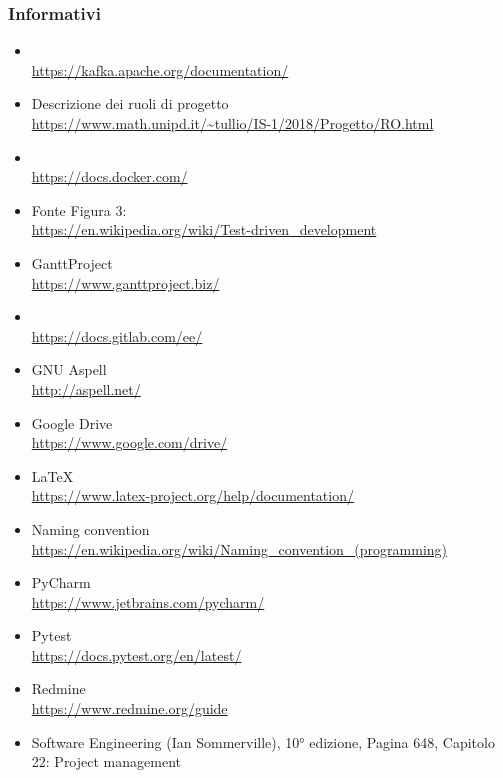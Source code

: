     \subsubsection{Informativi}	\label{rifinfo}
    \begin{itemize}
		\item {} \\\url{https://kafka.apache.org/documentation/}
        \item Descrizione dei ruoli di progetto \\\url{https://www.math.unipd.it/~tullio/IS-1/2018/Progetto/RO.html}
        \item {} \\\url{https://docs.docker.com/}
        \item Fonte Figura 3: \\\url{https://en.wikipedia.org/wiki/Test-driven_development}
        \item GanttProject \\\url{https://www.ganttproject.biz/}
		\item {} \\\url{https://docs.gitlab.com/ee/}
		\item GNU Aspell \\\url{http://aspell.net/}
        \item Google Drive \\\url{https://www.google.com/drive/}
		\item \LaTeX\ \\\url{https://www.latex-project.org/help/documentation/}
        \item Naming convention \\\url{https://en.wikipedia.org/wiki/Naming_convention_(programming)}
        \item PyCharm \\\url{https://www.jetbrains.com/pycharm/}
		\item Pytest \\\url{https://docs.pytest.org/en/latest/}
		\item Redmine \\\url{https://www.redmine.org/guide}
        \item Software Engineering (Ian Sommerville), 10° edizione,
        Pagina 648, Capitolo 22: Project management

\end{itemize}
